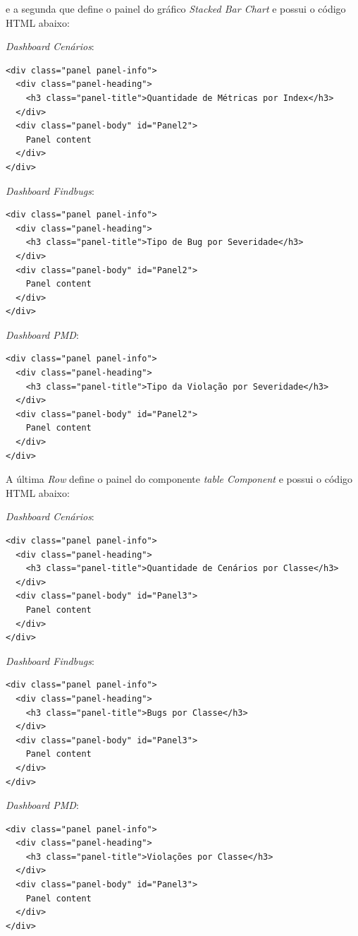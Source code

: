 \begin{apendicesenv}
e a segunda que define o painel do gráfico \textit{Stacked Bar Chart} e possui o código HTML abaixo: 


\textit{Dashboard Cenários}:
{\color{blue}
\begin{verbatim}
<div class="panel panel-info">
  <div class="panel-heading">
    <h3 class="panel-title">Quantidade de Métricas por Index</h3>
  </div>
  <div class="panel-body" id="Panel2">
    Panel content
  </div>
</div> 
\end{verbatim}
}

\textit{Dashboard Findbugs}:
{\color{blue}
\begin{verbatim}
<div class="panel panel-info">
  <div class="panel-heading">
    <h3 class="panel-title">Tipo de Bug por Severidade</h3>
  </div>
  <div class="panel-body" id="Panel2">
    Panel content
  </div>
</div> 
\end{verbatim}
}

\textit{Dashboard PMD}:
{\color{blue}
\begin{verbatim}
<div class="panel panel-info">
  <div class="panel-heading">
    <h3 class="panel-title">Tipo da Violação por Severidade</h3>
  </div>
  <div class="panel-body" id="Panel2">
    Panel content
  </div>
</div> 
\end{verbatim}
}

A última \textit{Row} define o painel do componente \textit{table Component} e possui o código HTML abaixo:

\textit{Dashboard Cenários}:
{\color{blue}
\begin{verbatim}
<div class="panel panel-info">
  <div class="panel-heading">
    <h3 class="panel-title">Quantidade de Cenários por Classe</h3>
  </div>
  <div class="panel-body" id="Panel3">
    Panel content
  </div>
</div> 

\end{verbatim}
}

\textit{Dashboard Findbugs}:
{\color{blue}
\begin{verbatim}
<div class="panel panel-info">
  <div class="panel-heading">
    <h3 class="panel-title">Bugs por Classe</h3>
  </div>
  <div class="panel-body" id="Panel3">
    Panel content
  </div>
</div> 
\end{verbatim}
}

\textit{Dashboard PMD}:
{\color{blue}
\begin{verbatim}
<div class="panel panel-info">
  <div class="panel-heading">
    <h3 class="panel-title">Violações por Classe</h3>
  </div>
  <div class="panel-body" id="Panel3">
    Panel content
  </div>
</div> 
\end{verbatim}
}


\end{apendicesenv}
